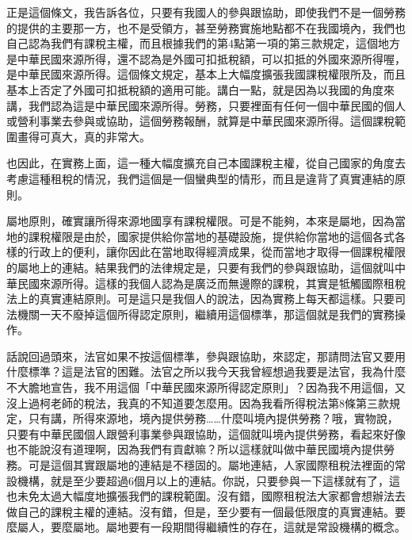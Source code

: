 \documentclass[]{ctexbook}
\begin{document}
正是這個條文，我告訴各位，只要有我國人的參與跟協助，即使我們不是一個勞務的提供的主要那一方，也不是受領方，甚至勞務實施地點都不在我國境內，我們也自己認為我們有課稅主權，而且根據我們的第4點第一項的第三款規定，這個地方是中華民國來源所得，還不認為是外國可扣抵稅額，可以扣抵的外國來源所得喔，是中華民國來源所得。這個條文規定，基本上大幅度擴張我國課稅權限所及，而且基本上否定了外國可扣抵稅額的適用可能。講白一點，就是因為以我國的角度來講，我們認為這是中華民國來源所得。勞務，只要裡面有任何一個中華民國的個人或營利事業去參與或協助，這個勞務報酬，就算是中華民國來源所得。這個課稅範圍畫得可真大，真的非常大。

也因此，在實務上面，這一種大幅度擴充自己本國課稅主權，從自己國家的角度去考慮這種租稅的情況，我們這個是一個蠻典型的情形，而且是違背了真實連結的原則。

屬地原則，確實讓所得來源地國享有課稅權限。可是不能夠，本來是屬地，因為當地的課稅權限是由於，國家提供給你當地的基礎設施，提供給你當地的這個各式各樣的行政上的便利，讓你因此在當地取得經濟成果，從而當地才取得一個課稅權限的屬地上的連結。結果我們的法律規定是，只要有我們的參與跟協助，這個就叫中華民國來源所得。這樣的我個人認為是廣泛而無邊際的課稅，其實是牴觸國際租稅法上的真實連結原則。可是這只是我個人的說法，因為實務上每天都這樣。只要司法機關一天不廢掉這個所得認定原則，繼續用這個標準，那這個就是我們的實務操作。

話說回過頭來，法官如果不按這個標準，參與跟協助，來認定，那請問法官又要用什麼標準？這是法官的困難。法官之所以我今天我曾經想過我要是法官，我為什麼不大膽地宣告，我不用這個「中華民國來源所得認定原則」？因為我不用這個，又沒上過柯老師的稅法，我真的不知道要怎麼用。因為我看所得稅法第8條第三款規定，只有講，所得來源地，境內提供勞務\ldots\ldots 什麼叫境內提供勞務？哦，實物說，只要有中華民國個人跟營利事業參與跟協助，這個就叫境內提供勞務，看起來好像也不能說沒有道理啊，因為我們有貢獻嘛？所以這樣就叫做中華民國境內提供勞務。可是這個其實跟屬地的連結是不穩固的。屬地連結，人家國際租稅法裡面的常設機構，就是至少要超過6個月以上的連結。你説，只要參與一下這樣就有了，這也未免太過大幅度地擴張我們的課稅範圍。沒有錯，國際租稅法大家都會想辦法去做自己的課稅主權的連結。沒有錯，但是，至少要有一個最低限度的真實連結。要麼屬人，要麼屬地。屬地要有一段期間得繼續性的存在，這就是常設機構的概念。
\end{document}
